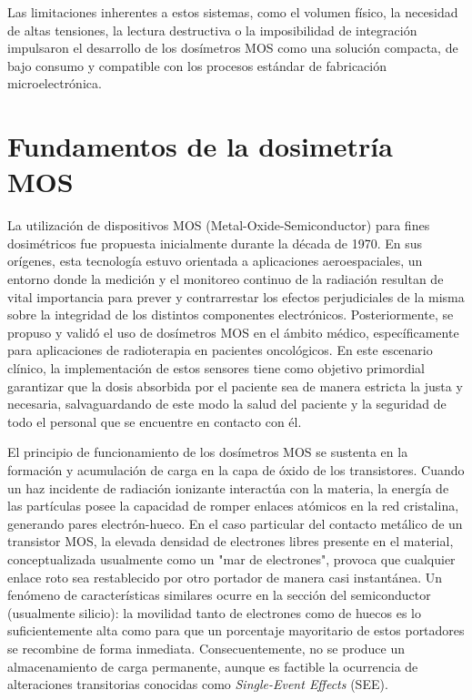 \documentclass[12pt,a4paper,oneside]{book}
\begin{document}
Las limitaciones inherentes a estos sistemas, como el volumen físico, la necesidad de altas tensiones, la lectura destructiva o la imposibilidad de integración impulsaron el desarrollo de los dosímetros MOS como una solución compacta, de bajo consumo y compatible con los procesos estándar de fabricación microelectrónica.

\section{Fundamentos de la dosimetría MOS}
La utilización de dispositivos MOS (Metal-Oxide-Semiconductor) para fines dosimétricos fue propuesta inicialmente durante la década de 1970. En sus orígenes, esta tecnología estuvo orientada a aplicaciones aeroespaciales, un entorno donde la medición y el monitoreo continuo de la radiación resultan de vital importancia para prever y contrarrestar los efectos perjudiciales de la misma sobre la integridad de los distintos componentes electrónicos. Posteriormente, se propuso y validó el uso de dosímetros MOS en el ámbito médico, específicamente para aplicaciones de radioterapia en pacientes oncológicos. En este escenario clínico, la implementación de estos sensores tiene como objetivo primordial garantizar que la dosis absorbida por el paciente sea de manera estricta la justa y necesaria, salvaguardando de este modo la salud del paciente y la seguridad de todo el personal que se encuentre en contacto con él.

El principio de funcionamiento de los dosímetros MOS se sustenta en la formación y acumulación de carga en la capa de óxido de los transistores. Cuando un haz incidente de radiación ionizante interactúa con la materia, la energía de las partículas posee la capacidad de romper enlaces atómicos en la red cristalina, generando pares electrón-hueco. En el caso particular del contacto metálico de un transistor MOS, la elevada densidad de electrones libres presente en el material, conceptualizada usualmente como un "mar de electrones", provoca que cualquier enlace roto sea restablecido por otro portador de manera casi instantánea. Un fenómeno de características similares ocurre en la sección del semiconductor (usualmente silicio): la movilidad tanto de electrones como de huecos es lo suficientemente alta como para que un porcentaje mayoritario de estos portadores se recombine de forma inmediata. Consecuentemente, no se produce un almacenamiento de carga permanente, aunque es factible la ocurrencia de alteraciones transitorias conocidas como \textit{Single-Event Effects} (SEE).
\end{document}
